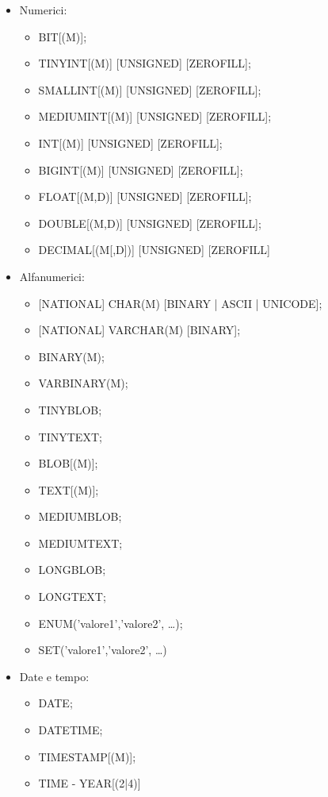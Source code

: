 \begin{itemize}

\item{Numerici}: 

\begin{itemize}

\item BIT[(M)];
\item TINYINT[(M)] [UNSIGNED] [ZEROFILL];
\item SMALLINT[(M)] [UNSIGNED] [ZEROFILL];
\item MEDIUMINT[(M)] [UNSIGNED] [ZEROFILL];
\item INT[(M)] [UNSIGNED] [ZEROFILL];
\item BIGINT[(M)] [UNSIGNED] [ZEROFILL];
\item FLOAT[(M,D)] [UNSIGNED] [ZEROFILL];
\item DOUBLE[(M,D)] [UNSIGNED] [ZEROFILL];
\item DECIMAL[(M[,D])] [UNSIGNED] [ZEROFILL]

\end{itemize}

\item{Alfanumerici}:

\begin{itemize}

\item{} [NATIONAL] CHAR(M) [BINARY | ASCII | UNICODE];
\item{} [NATIONAL] VARCHAR(M) [BINARY];
\item BINARY(M);
\item VARBINARY(M);
\item TINYBLOB;
\item TINYTEXT;
\item BLOB[(M)];
\item TEXT[(M)];
\item MEDIUMBLOB;
\item MEDIUMTEXT;
\item LONGBLOB;
\item LONGTEXT;
\item ENUM('valore1','valore2', \dots);
\item SET('valore1','valore2', \dots)

\end{itemize}

\item{Date e tempo}:

\begin{itemize}

\item DATE;
\item DATETIME;
\item TIMESTAMP[(M)];
\item TIME - YEAR[(2|4)] 

\end{itemize}

\end{itemize}

